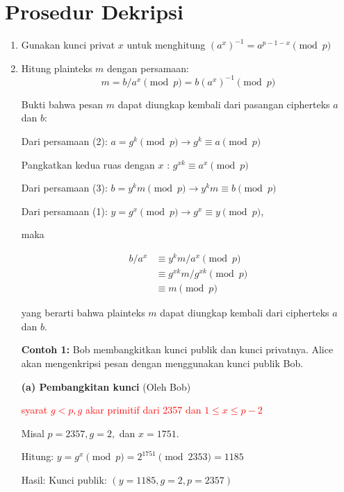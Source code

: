 \documentclass{article}
\begin{document}

\section*{Prosedur Dekripsi}

\begin{enumerate}
    \item Gunakan kunci privat $x$ untuk menghitung $(a^x)^{-1} = a^{p-1-x} \pmod{p}$
    \item Hitung plainteks $m$ dengan persamaan:
    \[ m = b/a^x \pmod{p} = b(a^x)^{-1} \pmod{p} \]

\newpage


Bukti bahwa pesan $m$ dapat diungkap kembali dari pasangan cipherteks $a$ dan $b$:

Dari persamaan (2): $a = g^k \pmod p \rightarrow g^k \equiv a \pmod p$

Pangkatkan kedua ruas dengan $x$ : $g^{xk} \equiv a^x \pmod p$

Dari persamaan (3): $b = y^k m \pmod p \rightarrow y^k m \equiv b \pmod p$

Dari persamaan (1): $y = g^x \pmod p \rightarrow g^x \equiv y \pmod p$,

maka

\begin{align*}
 b/a^x &\equiv y^k m / a^x \pmod p \\
 &\equiv g^{xk} m / g^{xk} \pmod p \\
 &\equiv m \pmod p
\end{align*}

yang berarti bahwa plainteks $m$ dapat diungkap kembali dari cipherteks $a$ dan $b$.

\newpage


\textbf{Contoh 1:} Bob membangkitkan kunci publik dan kunci privatnya. Alice akan mengenkripsi pesan dengan menggunakan kunci publik Bob.

\textbf{(a) Pembangkitan kunci} (Oleh Bob)

\textcolor{red}{syarat $g < p, g$ akar primitif dari 2357 dan $1 \le x \le p - 2$}

Misal $p = 2357, g = 2,$ dan $x = 1751$.

Hitung: $y = g^x \pmod p = 2^{1751} \pmod{2353} = 1185$

Hasil: Kunci publik: $(y = 1185, g = 2, p = 2357)$


\end{enumerate}
\end{document}
